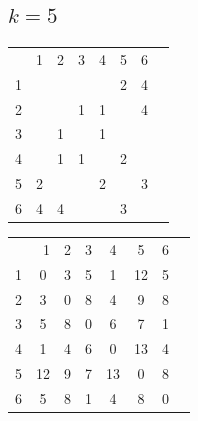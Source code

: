 \documentclass[10pt,a4paper,spanish]{report}
\theoremstyle{definition}
\theoremstyle{remark}
\begin{document}
\subsection{$k=5$}
\begin{minipage}{0.5\textwidth}
\begin{center}
\begin{tabular}{c|c|c|c|c|c|c|c|}
\multicolumn{2}{r}{1} & \multicolumn{1}{c}{2} & \multicolumn{1}{c}{3} & \multicolumn{1}{c}{4} & \multicolumn{1}{c}{5} & \multicolumn{1}{c}{6} \\ 
\cline{2-7}
1 & & & & & 2 & 4 \\
\cline{2-7} 
2 & & & 1 & 1 & & 4 \\
\cline{2-7} 
3 & & 1 & & 1 & & \\
\cline{2-7} 
4 & & 1 & 1 & & 2 & \\
\cline{2-7} 
5 & 2 & & & 2 & & 3 \\
\cline{2-7} 
6 & 4 & 4 & & & 3 & \\
\cline{2-7} 
\end{tabular}
\end{center}
\end{minipage}
\begin{minipage}{0.5\textwidth}
\begin{center}
\begin{tabular}{c|c|c|c|c|c|c|c|}
\multicolumn{2}{r}{1} & \multicolumn{1}{c}{2} & \multicolumn{1}{c}{3} & \multicolumn{1}{c}{4} & \multicolumn{1}{c}{5} & \multicolumn{1}{c}{6} \\ 
\cline{2-7}
1 & 0 & 3 & 5 & 1 & 12 & 5 \\
\cline{2-7} 
2 & 3 & 0 & 8 & 4 & 9 & 8 \\
\cline{2-7} 
3 & 5 & 8 & 0 & 6 & 7 & 1 \\
\cline{2-7} 
4 & 1 & 4 & 6 & 0 & 13 & 4 \\
\cline{2-7} 
5 & 12 & 9 & 7 & 13 & 0 &  8 \\
\cline{2-7} 
6 & 5 & 8 & 1 & 4 & 8 & 0 \\
\cline{2-7} 
\end{tabular}
\end{center}
\end{minipage}
\end{document}
